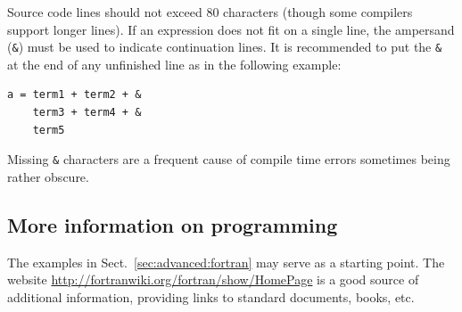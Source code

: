 \documentclass[times,onecolumn]{article}
\begin{document}
Source code lines should not exceed 80 characters (though some  compilers support longer lines). If an expression does not fit on a single line, the ampersand (\verb|&|) must be used to indicate continuation lines. It is recommended to put the \verb|&| at the end of any unfinished line as in the following example:

\begin{shaded}
\begin{small}
\begin{verbatim}
a = term1 + term2 + &
    term3 + term4 + &
    term5
\end{verbatim}
\end{small}
\end{shaded}

Missing \verb|&| characters are a frequent cause of compile time errors sometimes being rather obscure.

\subsection{More information on  programming}

The examples in Sect.~\ref{sec:advanced:fortran} may serve as a starting point. The website \url{http://fortranwiki.org/fortran/show/HomePage} is a good source of additional information, providing links to standard documents, books, etc.
\end{document}
